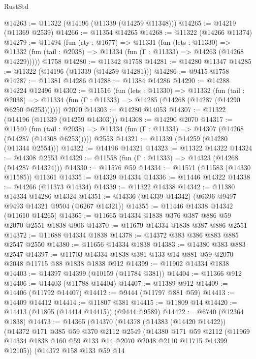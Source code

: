 \begin{lexlean}{RustStd}
\begin{coremodule}
@14263 := @11322 (@14196 (@11339 (@14259 @11348)))
@14265 := @14219 (@11369 @2539)
@14266 := @11354 @14265
@14268 := @11322 (@14266 @11374)
@14279 := @11494
    (fun (rty : @1677) =>
    @11331
      (fun (lets : @11330) =>
      @11332 (fun (tail : @2038) => @11334 (fun (Γ : @11333) => @14263 (@14268 @14229)))))
    @1758
@14280 := @11342 @1758
@14281 := @14280 @11347
@14285 := @11322 (@14196 (@11339 (@14259 @14281)))
@14286 := @9415 @1758
@14287 := @11381 @14286
@14288 := @11384 @14286
@14290 := @14288 @14224 @12496
@14302 := @11516
    (fun (lets : @11330) =>
    @11332
      (fun (tail : @2038) =>
      @11334 (fun (Γ : @11333) => @14285 (@14268 (@14287 (@14290 @6250 @6253))))))
    @2070
@14303 := @14280 @14053
@14307 := @11322 (@14196 (@11339 (@14259 @14303)))
@14308 := @14290 @2070
@14317 := @11540
    (fun (tail : @2038) => @11334 (fun (Γ : @11333) => @14307 (@14268 (@14287 (@14308 @6253)))))
    @2553
@14321 := @11339 (@14259 (@14280 (@11344 @2554)))
@14322 := @14196 @14321
@14323 := @11322 @14322
@14324 := @14308 @2553
@14329 := @11558 (fun (Γ : @11333) => @14323 (@14268 (@14287 @14324)))
@14330 := @11576 @59
@14334 := @11571 (@11583 (@14330 @11585)) @11361
@14335 := @14329 @14334
@14336 := @11446 @14322
@14338 := @14266 (@11373 @14334)
@14339 := @11322 @14338
@14342 := @11380 @14334 @14286 @14324
@14351 := @14336 (@14339 @14342) (@6396 @9497 @9493 @14321 @9504 (@6267 @14321))
@14355 := @11446 @14338 @14342 (@11610 @14265)
@14365 := @11665 @14334 @1838 @376 @387 @886 @59 @2070 @2551 @1838 @906
@14370 := @11679 @14334 @1838 @387 @886 @2551
@14372 := @11688 @14334 @1838
@14378 := @14372 @383 @386 @883 @885 @2547 @2550
@14380 := @11656 @14334 @1838
@14383 := @14380 @383 @883 @2547
@14397 := @11703 @14334 @1838 @381 @133 @14 @881 @59 @2070 @2048 @11715 @88 @1838 @1838 @912
@14399 := @11902 @14334 @1838
@14403 := @14397 @14399 (@10159 (@11784 @381))
@14404 := @11366 @912
@14406 := @14403 (@11788 @14404)
@14407 := @11389 @912
@14409 := @14406 (@11792 @14407)
@14412 := @9444 (@11797 @881 @59)
@14413 := @14409 @14412
@14414 := @11807 @381
@14415 := @11809 @14
@14420 := @14413 (@11805 (@14414 @14415)) (@9444 @9589)
@14422 := @6740 (@12364 @1838)
@14473 := @14365
    (@14370
      (@14378
        (@14383 (@14420 @14422))
        (@14372
          @171
          @385
          @59
          @370
          @2112
          @2549
          (@14380
            @171
            @59
            @2112
            (@11969 @14334 @1838 @160 @59 @133 @14 @2070 @2048 @2110 @11715 @14399 @12105))
          (@14372
            @158
            @133
            @59
            @14

\end{coremodule}
\end{lexlean}
